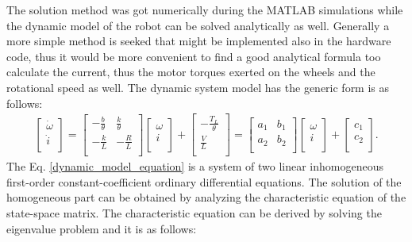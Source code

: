 \documentclass[12pt,english]{article}
\begin{document}
The solution method was got numerically during the MATLAB simulations while the dynamic model of the robot can be solved analytically as well. Generally a more simple method is seeked that might be implemented also in the hardware code, thus it would be more convenient to find a good analytical formula too calculate the current, thus the motor torques exerted on the wheels and the rotational speed as well. 
The dynamic system model has the generic form is as follows:
\begin{eqnarray}
\left[
\begin{array}{c}
\dot \omega\\[2ex]
\dot i \\
\end{array}
\right]=
\left[
\begin{array}{ccc}
-\frac{b}{\theta } & \frac{k}{\theta } \\[2ex]
-\frac{k}{L} & -\frac{R}{L} \\
\end{array}
\right]
\left[
\begin{array}{c}
\omega  \\[2ex]
i 	\\
\end{array}
\right]
+
\left[
\begin{array}{c}
-\frac{T_{L}}{\theta}  \\[2ex]
\frac{V}{L} 	\\
\end{array}
\right] = 
\left[
\begin{array}{ccc}
a_1 & b_1 \\[2ex]
a_2 & b_2 \\
\end{array}
\right]
\left[
\begin{array}{c}
\omega  \\[2ex]
i 	\\
\end{array}
\right]
+
\left[
\begin{array}{c}
c_1  \\[2ex]
c_2 	\\
\end{array}
\right]
.
\label{dynamic_model_equation}
\end{eqnarray}
The Eq. \ref{dynamic_model_equation} is a system of two linear inhomogeneous first-order constant-coefficient ordinary differential equations. The solution of the homogeneous  part can be obtained by analyzing the characteristic equation of the state-space matrix. The characteristic equation can be derived by solving the eigenvalue problem and it is as follows:
\end{document}
